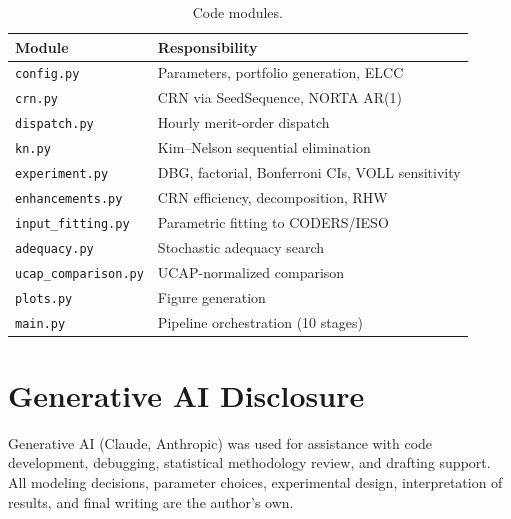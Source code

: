\documentclass[11pt]{article}
\begin{document}
\begin{table}[H]
\centering
\caption{Code modules.}\label{tab:code}
\small
\begin{tabular}{ll}
\toprule
Module & Responsibility \\
\midrule
\texttt{config.py} & Parameters, portfolio generation, ELCC \\
\texttt{crn.py} & CRN via SeedSequence, NORTA AR(1) \\
\texttt{dispatch.py} & Hourly merit-order dispatch \\
\texttt{kn.py} & Kim--Nelson sequential elimination \\
\texttt{experiment.py} & DBG, factorial, Bonferroni CIs, VOLL sensitivity \\
\texttt{enhancements.py} & CRN efficiency, decomposition, RHW \\
\texttt{input\_fitting.py} & Parametric fitting to CODERS/IESO \\
\texttt{adequacy.py} & Stochastic adequacy search \\
\texttt{ucap\_comparison.py} & UCAP-normalized comparison \\
\texttt{plots.py} & Figure generation \\
\texttt{main.py} & Pipeline orchestration (10 stages) \\
\bottomrule
\end{tabular}
\end{table}


\section{Generative AI Disclosure}\label{app:ai}

Generative AI (Claude, Anthropic) was used for assistance with code development, debugging, statistical methodology review, and drafting support. All modeling decisions, parameter choices, experimental design, interpretation of results, and final writing are the author's own.
\end{document}
